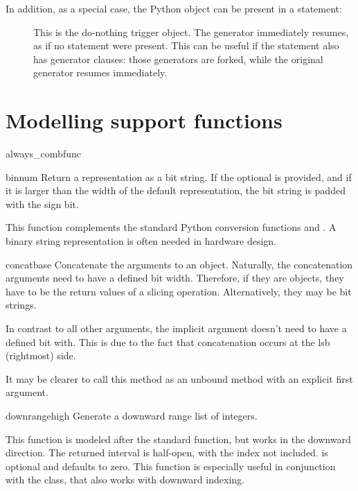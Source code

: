 In addition, as a special case, the Python  object can be
present in  a  statement:
\begin{description}

\item[]
This is the do-nothing trigger object. The generator immediately
resumes, as if no  statement were present. This can be
useful if the  statement also has generator clauses: those
generators are forked, while the original generator resumes
immediately.
\end{description}



\section{Modelling support functions \label{ref-misc}}

\begin{funcdesc}{always_comb}{func}

\end{funcdesc}

\begin{funcdesc}{bin}{num }
Return a representation as a bit string.  If the optional 
is provided, and if it is larger than the width of the default
representation, the bit string is padded with the sign bit.

This function complements the standard Python conversion functions
 and . A binary string representation is often
needed in hardware design.
\end{funcdesc}

\begin{funcdesc}{concat}{base }
Concatenate the arguments to an  object. Naturally, the
concatenation arguments need to have a defined bit width. Therefore,
if they are  objects, they have to be the return values
of a slicing operation. Alternatively, they may be bit strings.

In contrast to all other arguments, the implicit  argument
doesn't need to have a defined bit with. This is due to the fact that
concatenation occurs at the lsb (rightmost) side.

It may be clearer to call this method as an unbound method with an
explicit first  argument.
\end{funcdesc}

\begin{funcdesc}{downrange}{high }
Generate a downward range list of integers.

This function is modeled after the standard  function, but
works in the downward direction. The returned interval is half-open,
with the  index not included.  is optional and
defaults to zero.  This function is especially useful in conjunction
with the  class, that also works with downward indexing.
\end{funcdesc}

